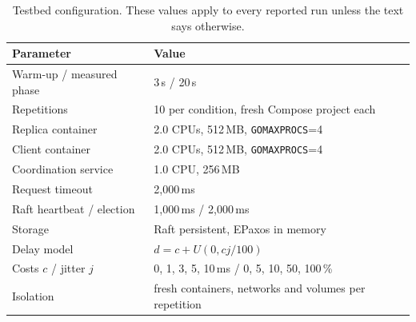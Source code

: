 \begin{table}[t]
\caption{Testbed configuration. These values apply to every reported run
unless the text says otherwise.}
\label{tab:testbed}
\footnotesize
\setlength{\tabcolsep}{4pt}
\begin{tabular}{@{}ll@{}}
\toprule
Parameter & Value \\
\midrule
Warm-up / measured phase & 3\,s / 20\,s \\
Repetitions & 10 per condition, fresh Compose project each \\
Replica container & 2.0 CPUs, 512\,MB, \texttt{GOMAXPROCS}=4 \\
Client container & 2.0 CPUs, 512\,MB, \texttt{GOMAXPROCS}=4 \\
Coordination service & 1.0 CPU, 256\,MB \\
Request timeout & 2{,}000\,ms \\
Raft heartbeat / election & 1{,}000\,ms / 2{,}000\,ms \\
Storage & Raft persistent, EPaxos in memory \\
Delay model & $d = c + U(0, cj/100)$ \\
Costs $c$ / jitter $j$ & 0, 1, 3, 5, 10\,ms / 0, 5, 10, 50, 100\,\% \\
Isolation & fresh containers, networks and volumes per repetition \\
\bottomrule
\end{tabular}
\end{table}

